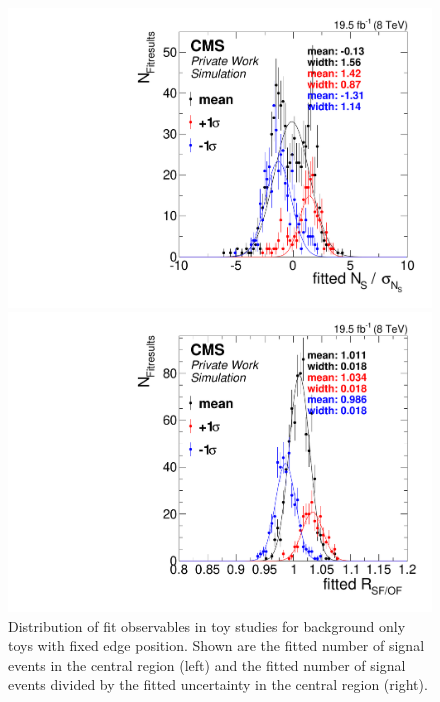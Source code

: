 \begin{figure}[hbp]
  \centering
  \begin{minipage}[t]{0.49\textwidth}
    \includegraphics[width=\textwidth]{plots/results/fit/nS_systShift.pdf}
  \end{minipage}
  \begin{minipage}[t]{0.49\textwidth}
    \includegraphics[width=\textwidth]{plots/results/fit/rSFOF_systShift.pdf}
  \end{minipage}

  \caption{Distribution of fit observables in toy studies for background only toys with fixed edge position. Shown are the fitted number of signal events in the central region (left) and the fitted number of signal events divided by the fitted uncertainty in the central region (right).}
  \label{fig:toys:systShift}
\end{figure}
